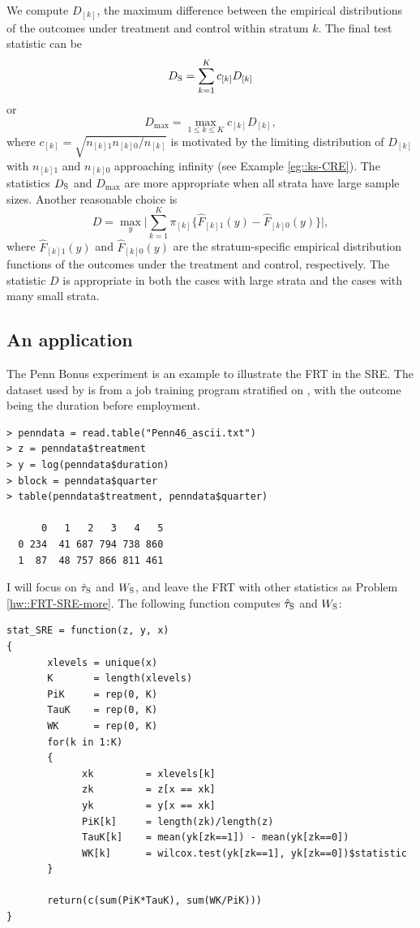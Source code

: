  \begin{example}
\label{eg::ks-stratified}
We compute $D_{[k]}$, the maximum difference between the empirical distributions of the outcomes under treatment and control within stratum $k$. The final test statistic can be 
$$
D_\textsc{S}  = \sum_{k=1}^K    c_{[k]}    D_{[k]}
$$
or 
$$
D_{\max} = \max_{1\leq k \leq K}  c_{[k]}   D_{[k]},
$$ 
where $ c_{[k]}   = \sqrt{   n_{[k]1}  n_{[k]0} /  n_{[k]}  }$ is motivated by the limiting distribution of $D_{[k]}$ with $n_{[k]1} $ and $ n_{[k]0} $ approaching infinity (see Example \ref{eg::ks-CRE}). The statistics $D_\textsc{S} $ and $D_{\max} $ are more appropriate when all strata have large sample sizes. 
Another reasonable choice is
$$
D =  \max_y \Big |  \sum_{k=1}^K  \pi_{[k]}  \{  \hat{F}_{[k]1}(y)  - \hat{F}_{[k]0}(y) \}   \Big | ,
$$
where $\hat{F}_{[k]1}(y)  $ and $ \hat{F}_{[k]0}(y)$ are the stratum-specific empirical distribution functions of the outcomes under the treatment and control, respectively. The statistic $D$ is appropriate in both the cases with large strata and the cases with many small strata. 
\end{example}
 
 
 
 \subsection{An application}
 \label{sec::frt-pennbonus}
 
 
 
The Penn Bonus experiment is an example to illustrate the FRT in the SRE. The dataset used by  \citet{koenker2002inference}  is from a job training program stratified on , with the outcome being the duration before employment. 

\begin{lstlisting}
> penndata = read.table("Penn46_ascii.txt")
> z = penndata$treatment
> y = log(penndata$duration)
> block = penndata$quarter
> table(penndata$treatment, penndata$quarter)
   
      0   1   2   3   4   5
  0 234  41 687 794 738 860
  1  87  48 757 866 811 461
\end{lstlisting} 


I will focus on $\hat{\tau}_\textsc{S}$ and $W_\textsc{S}$, and leave the FRT with other statistics as Problem \ref{hw::FRT-SRE-more}. 
The following function computes $\hat{\tau}_\textsc{S}$ and $W_\textsc{S}$:

\begin{lstlisting}
stat_SRE = function(z, y, x)
{
       xlevels = unique(x)
       K       = length(xlevels)
       PiK     = rep(0, K)
       TauK    = rep(0, K)
       WK      = rep(0, K)
       for(k in 1:K)
       {
             xk         = xlevels[k]
             zk         = z[x == xk]
             yk         = y[x == xk]
             PiK[k]     = length(zk)/length(z)
             TauK[k]    = mean(yk[zk==1]) - mean(yk[zk==0])
             WK[k]      = wilcox.test(yk[zk==1], yk[zk==0])$statistic
       }
       
       return(c(sum(PiK*TauK), sum(WK/PiK)))
}
\end{lstlisting} 


